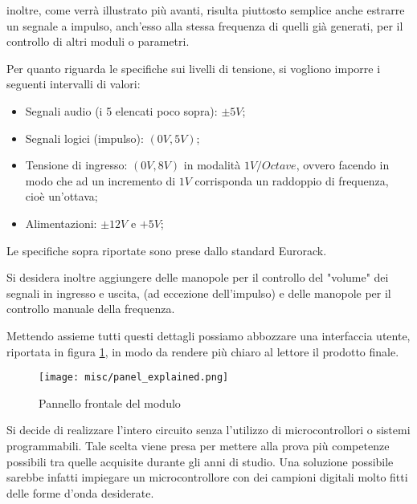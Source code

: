 inoltre, come verrà illustrato più avanti, risulta piuttosto semplice anche estrarre un
segnale a impulso, anch'esso alla stessa frequenza di quelli già generati, per il controllo
di altri moduli o parametri.
\smallskip

Per quanto riguarda le specifiche sui livelli di tensione, si vogliono imporre i seguenti
intervalli di valori:

\begin{itemize}
    \item Segnali audio (i 5 elencati poco sopra): $\pm5V$;
    \item Segnali logici (impulso): $(0V,5V)$;
    \item Tensione di ingresso: $(0V,8V)$ in modalità $1V/Octave$, ovvero facendo in modo che
          ad un incremento di $1V$ corrisponda un raddoppio di frequenza, cioè un'ottava;
    \item Alimentazioni: $\pm12V$ e $+5V$;
\end{itemize}

Le specifiche sopra riportate sono prese dallo standard Eurorack.

Si desidera inoltre aggiungere delle manopole per il controllo del "volume" dei segnali
in ingresso e uscita, (ad eccezione dell'impulso) e delle manopole per il controllo
manuale della frequenza.

Mettendo assieme tutti questi dettagli possiamo abbozzare una interfaccia utente,
riportata in figura \ref{panel_explained}, in modo da rendere più chiaro al lettore il
prodotto finale.
\medskip

\begin{figure}[ht]
    \centering
    \texttt{[image: misc/panel\_explained.png]}
    \caption{Pannello frontale del modulo}
    \label{panel_explained}
\end{figure}

Si decide di realizzare l'intero circuito senza l'utilizzo di microcontrollori o sistemi
programmabili. Tale scelta viene presa per mettere alla prova più competenze possibili tra
quelle acquisite durante gli anni di studio. Una soluzione possibile sarebbe infatti
impiegare un microcontrollore con dei campioni digitali molto fitti delle forme d'onda
desiderate.

